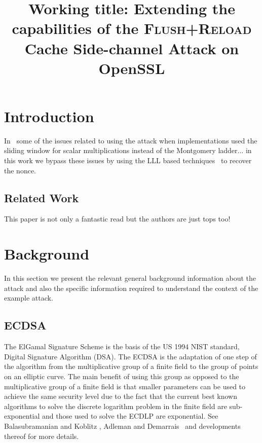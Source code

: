\documentclass[twocolumn]{article}
\newcommand{\fl}{\textsc{Flu\-sh+\allowbreak Re\-load}\xspace}
\newcommand{\myupcase}[1]{\uppercase{#1}}
\begin{document}
\title{Working title: Extending the capabilities of the \fl Cache Side-channel Attack on OpenSSL}

\maketitle

\begin{abstract}

\end{abstract}

\section{Introduction}
In~\cite{yarom_benger_2013} some of the issues related to using the attack when implementations used the sliding window for scalar multiplications instead of the Montgomery ladder... in this work we bypass these issues by using the LLL based techniques~\cite{nguyen03insecurity} to recover the nonce.

\subsection{Related Work}\label{sub:related}
This paper is not only a fantastic read but the authors are just tops too! \cite{yarom_benger_2013}

\section{Background}\label{sec:background}
In this section we present the relevant general background information about the attack and also the specific information required to understand the context of the example attack. 

\subsection{ECDSA}\label{sub:ecdsa}

The ElGamal Signature Scheme \cite{Elgamal85} is the basis of the US 1994 NIST standard, Digital Signature Algorithm (\myupcase{dsa}). The \myupcase{ecdsa} is the adaptation of one step of the algorithm from the multiplicative group of a finite field to the group of points on an elliptic curve. The main benefit of using this group as opposed to the multiplicative group of a finite field is that smaller parameters can be used to achieve the same security level \cite{koblitz87elliptic,miller85use} due to the fact that the current best known algorithms to solve the discrete logarithm problem in the finite field are sub-exponential and those used to solve the \myupcase{ecdlp} are exponential.
See Balasubramanian and Kob\-litz \cite{balasubramanian-koblitz}, Adleman and Demarrais~\cite{adelman-demarrais} and developments thereof for more details. 
\end{document}
